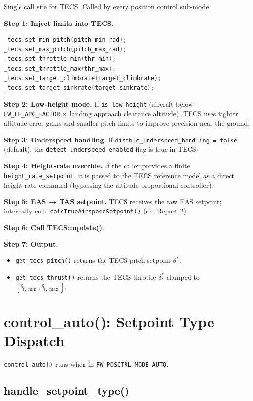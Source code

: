 \documentclass[12pt,a4paper]{article}
\begin{document}
Single call site for TECS. Called by every position control sub-mode.

\textbf{Step 1: Inject limits into TECS.}
\begin{lstlisting}[language=C++]
_tecs.set_min_pitch(pitch_min_rad);
_tecs.set_max_pitch(pitch_max_rad);
_tecs.set_throttle_min(thr_min);
_tecs.set_throttle_max(thr_max);
_tecs.set_target_climbrate(target_climbrate);
_tecs.set_target_sinkrate(target_sinkrate);
\end{lstlisting}

\textbf{Step 2: Low-height mode.}
If \texttt{is\_low\_height} (aircraft below \texttt{FW\_LH\_APC\_FACTOR}
$\times$ landing approach clearance altitude), TECS uses tighter altitude
error gains and smaller pitch limits to improve precision near the ground.

\textbf{Step 3: Underspeed handling.}
If \texttt{disable\_underspeed\_handling = false} (default), the
\texttt{detect\_underspeed\_enabled} flag is true in TECS.

\textbf{Step 4: Height-rate override.}
If the caller provides a finite \texttt{height\_rate\_setpoint}, it
is passed to the TECS reference model as a direct height-rate command
(bypassing the altitude proportional controller).

\textbf{Step 5: EAS → TAS setpoint.}
TECS receives the raw EAS setpoint; internally calls
\texttt{calcTrueAirspeedSetpoint()} (see Report 2).

\textbf{Step 6: Call TECS::update()}.

\textbf{Step 7: Output.}
\begin{itemize}
  \item \texttt{get\_tecs\_pitch()} returns the TECS pitch setpoint $\theta^*$.
  \item \texttt{get\_tecs\_thrust()} returns the TECS throttle $\delta_t^*$
        clamped to $[\delta_{t,\min}, \delta_{t,\max}]$.
\end{itemize}

\section{control\_auto(): Setpoint Type Dispatch}

\texttt{control\_auto()} runs when in \texttt{FW\_POSCTRL\_MODE\_AUTO}.

\subsection{handle\_setpoint\_type()}
\end{document}
